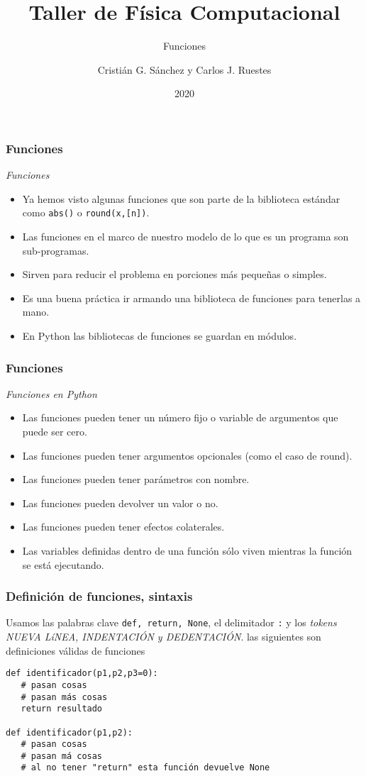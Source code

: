 \documentclass{beamer}
\title{Taller de Física Computacional}
\subtitle{Funciones}
\author{Cristián G. Sánchez y Carlos J. Ruestes}
\date{2020}
\begin{document}
\frame{\titlepage}

\begin{frame}[fragile]
\frametitle{Funciones}
\begin{block}{{\em Funciones}}
\begin{itemize}
\item Ya hemos visto algunas funciones que son parte de la biblioteca estándar como  \texttt{abs()} o \texttt{round(x,[n])}.
\item Las funciones en el marco de nuestro modelo de lo que es un programa son sub-programas.
\item Sirven para reducir el problema en porciones más pequeñas o simples.
\item Es una buena práctica ir armando una biblioteca de funciones para tenerlas a mano.
\item En Python las bibliotecas de funciones se guardan en \alert{módulos}.
\end{itemize}
\end{block}
\end{frame}

\begin{frame}[fragile]
\frametitle{Funciones}
\begin{block}{{\em Funciones en Python}}
\begin{itemize}
\item Las funciones pueden tener un número fijo o variable de argumentos que puede ser cero.
\item Las funciones pueden tener argumentos opcionales (como el caso de round).
\item Las funciones pueden tener parámetros con nombre.
\item Las funciones pueden devolver un valor o no.
\item Las funciones pueden tener \alert{efectos colaterales}.
\item Las variables definidas dentro de una función sólo viven mientras la función se está ejecutando.
\end{itemize}
\end{block}
\end{frame}

\begin{frame}[fragile]
\frametitle{Definición de funciones, sintaxis}
Usamos las palabras clave \texttt{def, return, None}, el delimitador \texttt{:} y los {\em tokens NUEVA LíNEA, INDENTACIÓN y DEDENTACIÓN}. las siguientes son definiciones válidas de funciones
\begin{block}{}
\begin{verbatim}
def identificador(p1,p2,p3=0):
   # pasan cosas
   # pasan más cosas
   return resultado 
 
def identificador(p1,p2):
   # pasan cosas
   # pasan má cosas
   # al no tener "return" esta función devuelve None
   
\end{verbatim}
\end{block}
\end{frame}
\end{document}
